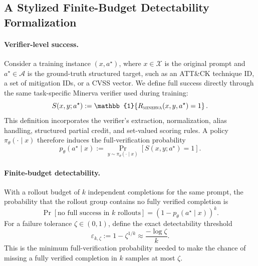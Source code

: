 

\subsection{A Stylized Finite-Budget Detectability Formalization}
\label{app:minervarl-support-formalization}

\paragraph{Verifier-level success.}
Consider a training instance $(x,a^\star)$, where $x\in\mathcal{X}$ is the original prompt and
$a^\star\in\mathcal{A}$ is the ground-truth structured target, such as an ATT\&CK technique ID,
a set of mitigation IDs, or a CVSS vector. We define full success directly through the same task-specific
Minerva verifier used during training:
\begin{equation}
    S(x,y;a^\star)
    :=
    \mathbb{1}\!\left\{R_{\textsc{minerva}}(x,y,a^\star)=1\right\}.
\end{equation}
This definition incorporates the verifier's extraction, normalization, alias handling, structured
partial credit, and set-valued scoring rules. A policy $\pi_\theta(\cdot\mid x)$ therefore induces the
full-verification probability
\begin{equation}
    p_\theta(a^\star\mid x)
    :=
    \Pr_{y\sim\pi_\theta(\cdot\mid x)}
    \left[S(x,y;a^\star)=1\right].
\end{equation}

\paragraph{Finite-budget detectability.}
With a rollout budget of $k$ independent completions for the same prompt, the probability that the
rollout group contains no fully verified completion is
\begin{equation}
    \Pr[\text{no full success in $k$ rollouts}]
    =
    \left(1-p_\theta(a^\star\mid x)\right)^k .
\end{equation}
For a failure tolerance $\zeta\in(0,1)$, define the exact detectability threshold
\begin{equation}
    \varepsilon_{k,\zeta}
    :=
    1-\zeta^{1/k}
    \approx
    \frac{-\log \zeta}{k}.
\end{equation}
This is the minimum full-verification probability needed to make the chance of missing a fully verified
completion in $k$ samples at most $\zeta$.

